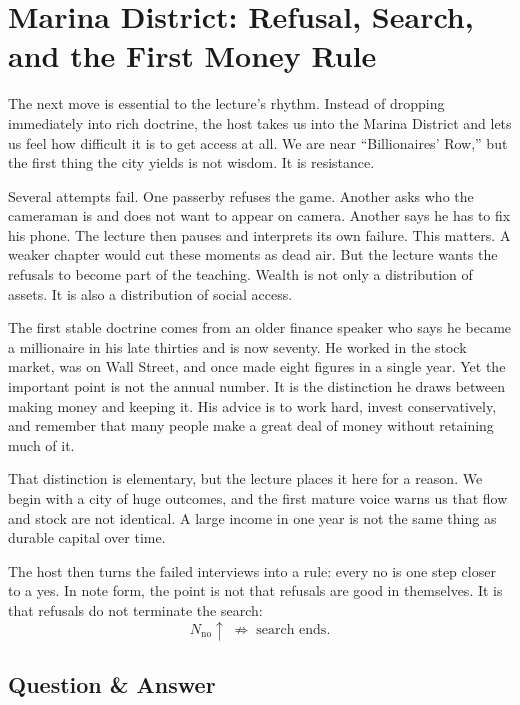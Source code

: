 \section{Marina District: Refusal, Search, and the First Money Rule}

The next move is essential to the lecture's rhythm. Instead of dropping immediately into rich doctrine, the host takes us into the Marina District and lets us feel how difficult it is to get access at all. We are near ``Billionaires' Row,'' but the first thing the city yields is not wisdom. It is resistance.

Several attempts fail. One passerby refuses the game. Another asks who the cameraman is and does not want to appear on camera. Another says he has to fix his phone. The lecture then pauses and interprets its own failure. This matters. A weaker chapter would cut these moments as dead air. But the lecture wants the refusals to become part of the teaching. Wealth is not only a distribution of assets. It is also a distribution of social access.

The first stable doctrine comes from an older finance speaker who says he became a millionaire in his late thirties and is now seventy. He worked in the stock market, was on Wall Street, and once made eight figures in a single year. Yet the important point is not the annual number. It is the distinction he draws between making money and keeping it. His advice is to work hard, invest conservatively, and remember that many people make a great deal of money without retaining much of it.

That distinction is elementary, but the lecture places it here for a reason. We begin with a city of huge outcomes, and the first mature voice warns us that flow and stock are not identical. A large income in one year is not the same thing as durable capital over time.

The host then turns the failed interviews into a rule: every no is one step closer to a yes. In note form, the point is not that refusals are good in themselves. It is that refusals do not terminate the search:
\begin{equation}
N_{\text{no}}\uparrow \;\not\Rightarrow\; \text{search ends}.
\end{equation}

\subsection{Question \& Answer}

